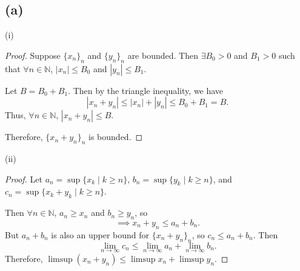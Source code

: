 \documentclass{article}
\newcommand{\N}{\mathbb{N}} %
\begin{document}
\subsection*{(a)}
(i) 
\begin{proof}
	Suppose $\{x_n\}_n$ and $\{y_n\}_n$ are bounded. Then $\exists B_0 > 0$ and $B_1 > 0$ such that $\forall n \in \N$, $|x_n| \leq B_0$ and $|y_n| \leq B_1$.
	
	Let $B = B_0 + B_1$. Then by the triangle inequality, we have
	\begin{equation}
		|x_n + y_n| \leq |x_n| + |y_n| \leq B_0 + B_1 = B.
	\end{equation}
	Thus, $\forall n \in \N$, $|x_n + y_n| \leq B$.
	
	Therefore, $\{x_n + y_n\}_n$ is bounded.
\end{proof}

(ii) 
\begin{proof}
	Let $a_n = \sup\{x_k \;|\; k\geq n\}$, $b_n = \sup\{y_k \;|\; k\geq n\}$, and \\$c_n = \sup\{x_k + y_k \;|\; k\geq n\}$.
	
	Then $\forall n \in \N$, $a_n \geq x_n$ and $b_n \geq y_n$, so
	\begin{equation}
		\implies x_n + y_n \leq a_n + b_n.
	\end{equation}
	But $a_n + b_n$ is also an upper bound for $\{x_n + y_n\}_n$, so $c_n \leq a_n + b_n$. Then
	\begin{equation}
		\lim_{n \to \infty} c_n \leq \lim_{n \to \infty} a_n + \lim_{n \to \infty} b_n.
	\end{equation}
	Therefore, $\limsup(x_n + y_n) \leq \limsup x_n + \limsup y_n$.
\end{proof}
\end{document}
